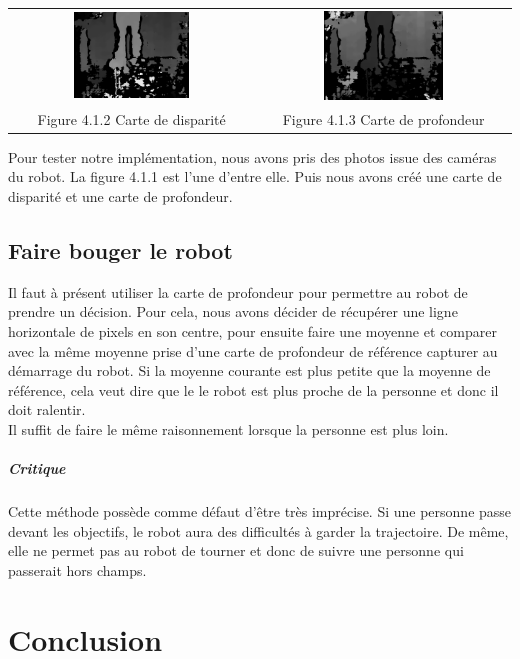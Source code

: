 \documentclass[12pt,a4paper]{report}
\begin{document}
\begin{center}
\begin{tabular}{cc}
  \vspace{0pt} \includegraphics[width=0.49\textwidth]{Carte_de_disparite.png} &
  \vspace{0pt} \includegraphics[width=0.49\textwidth]{Carte_de_profondeur.png} \\
    
	Figure 4.1.2 Carte de disparité & Figure 4.1.3 Carte de profondeur
\end{tabular}
\end{center}

Pour tester notre implémentation, nous avons pris des photos issue des caméras du robot. La figure 4.1.1 est l'une d'entre elle. Puis nous avons créé une carte de disparité et une carte de profondeur. 

\section{Faire bouger le robot}
Il faut à présent utiliser la carte de profondeur pour permettre au robot de prendre un décision. Pour cela, nous avons décider de récupérer une ligne horizontale de pixels en son centre, pour ensuite faire une moyenne et comparer avec la même moyenne prise d'une carte de profondeur de référence capturer au démarrage du robot. Si la moyenne courante est plus petite que la moyenne de référence, cela veut dire que le le robot est plus proche de la personne et donc il doit ralentir.\\
Il suffit de faire le même raisonnement lorsque la personne est plus loin.

\paragraph{Critique}
Cette méthode possède comme défaut d'être très imprécise. Si une personne passe devant les objectifs, le robot aura des difficultés à garder la trajectoire. De même, elle ne permet pas au robot de tourner et donc de suivre une personne qui passerait hors champs.

\chapter{Conclusion}
\end{document}
